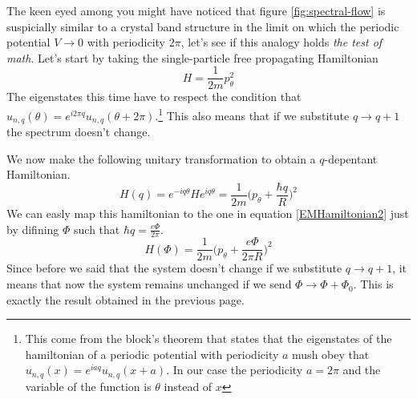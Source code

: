         The keen eyed among you might have noticed that figure \ref{fig:spectral-flow} is suspicially similar to a crystal band structure in the limit on which the periodic potential $V\to 0$ with periodicity $2\pi$, let's see if this analogy holds \textit{the test of math}. Let's start by taking the single-particle free propagating Hamiltonian 
        \[
            H=\frac 1{2m}p_\theta^2
        \]
        The eigenstates this time have to respect the condition that $u_{n,q}(\theta)=e^{i2\pi q}u_{n,q}(\theta+2\pi)$.\footnote{This come from the block's theorem that states that the eigenstates of the hamiltonian of a periodic potential with periodicity $a$ mush obey that $u_{n,q}(x)=e^{iaq}u_{n,q}(x+a)$. In our case the periodicity $a=2\pi$ and the variable of the function is $\theta$ instead of $x$} This also means that if we substitute $q\to q+1$ the spectrum doesn't change. 

        We now make the following unitary transformation to obtain a $q$-depentant Hamiltonian.
        \[
            H(q)=e^{-iq\theta}He^{iq\theta}=\frac 1{2m}\bigg (p_\theta + \frac {\hbar q}R \bigg)^2
        \]
        We can easly map this hamiltonian to the one in equation \ref{EMHamiltonian2} just by difining $\Phi$ such that $\hbar q= \frac {e\Phi}{2\pi}$. 
        \begin{equation} \label{blochA}
            H(\Phi)=\frac 1{2m}\bigg(p_\theta + \frac{e\Phi}{2\pi R}\bigg)^2
        \end{equation}
        Since before we said that the system doesn't change if we substitute $q\to q+1$, it means that now the system remains unchanged if we send $\Phi \to \Phi+\Phi_0$. This is exactly the result obtained in the previous page.
    
